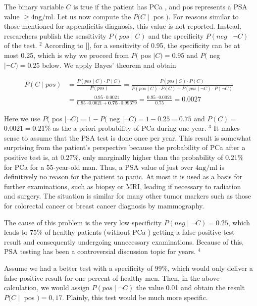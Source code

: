 \documentclass[10pt]{article}
\begin{document}
The binary variable $C$ is true if the patient has PCa , and pos represents a PSA value $\geq 4 \mathrm{ng} / \mathrm{ml}$. Let us now compute the $P(C \mid$ pos $)$. For reasons similar to those mentioned for appendicitis diagnosis, this value is not reported. Instead, researchers publish the sensitivity $P(p o s \mid C)$ and the specificity $P(n e g \mid \neg C)$ of the test. ${ }^{2}$ According to [\cite{hammerer2004stellenwert}], for a sensitivity of 0.95, the specificity can be at most 0.25, which is why we proceed from $P($ pos $\mid C)=0.95$ and $P($ neg $\mid \neg C)=0.25$ below. We apply Bayes' theorem and obtain


$$
\begin{aligned}
P(C \mid p o s) & =\frac{P(p o s \mid C) \cdot P(C)}{P(p o s)}=\frac{P(p o s \mid C) \cdot P(C)}{P(p o s \mid C) \cdot P(C)+P(p o s \mid \neg C) \cdot P(\neg C)} \\
& =\frac{0.95 \cdot 0.0021}{0.95 \cdot 0.0021+\mathbf{0 . 7 5} \cdot 0.99679}=\frac{0.95 \cdot 0.0021}{0.75}=0.0027
\end{aligned}
$$

Here we use $P($ pos $\mid \neg C)=1-P($ neg $\mid \neg C)=1-0.25=0.75$ and $P(C)=$ $0.0021=0.21 \%$ as the a priori probability of PCa during one year. ${ }^{3}$ It makes sense to assume that the PSA test is done once per year. This result is somewhat surprising from the patient's perspective because the probability of PCa after a positive test is, at $0.27 \%$, only marginally higher than the probability of $0.21 \%$ for PCa for a 55-year-old man. Thus, a PSA value of just over $4 \mathrm{ng} / \mathrm{ml}$ is definitively no reason for the patient to panic. At most it is used as a basis for further examinations, such as biopsy or MRI, leading if necessary to radiation and surgery. The situation is similar for many other tumor markers such as those for colorectal cancer or breast cancer diagnosis by mammography.

The cause of this problem is the very low specificity $P(n e g \mid \neg C)=0.25$, which leads to $75 \%$ of healthy patients (without PCa ) getting a false-positive test result and consequently undergoing unnecessary examinations. Because of this, PSA testing has been a controversial discussion topic for years. ${ }^{4}$

Assume we had a better test with a specificity of $99 \%$, which would only deliver a false-positive result for one percent of healthy men. Then, in the above calculation, we would assign $P(p o s \mid \neg C)$ the value 0.01 and obtain the result $P(C \mid$ pos $)=0,17$. Plainly, this test would be much more specific.
\end{document}
